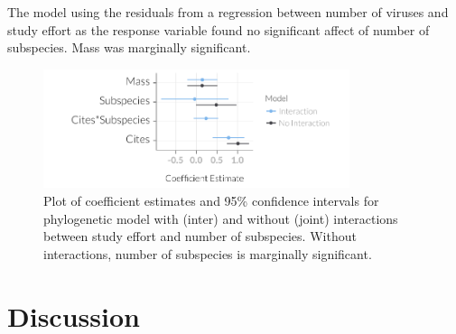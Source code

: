 The model using the residuals from a regression between number of viruses and study effort as the response variable found no significant affect of number of subspecies. 
Mass was marginally significant.




\begin{knitrout}\footnotesize
{}\color{fgcolor}\begin{figure}[t]

{\centering \includegraphics[width=0.8\textwidth]{figure/plotSubspeciesCoefs-1} 

}

\caption[
Plot of coefficient estimates and 95\% confidence intervals for phylogenetic model with (inter) and without (joint) interactions between study effort and number of subspecies]{
Plot of coefficient estimates and 95\% confidence intervals for phylogenetic model with (inter) and without (joint) interactions between study effort and number of subspecies. 
Without interactions, number of subspecies is marginally significant.
}\label{fig:plotSubspeciesCoefs}
\end{figure}


\end{knitrout}











\clearpage
\section{Discussion}  










